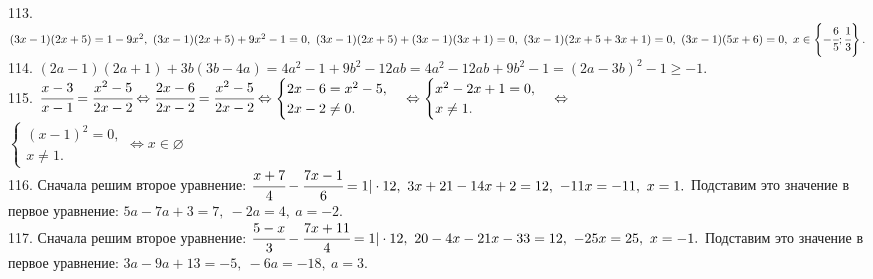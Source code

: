 113. $(3x-1)(2x+5)=1-9x^2,\ (3x-1)(2x+5)+9x^2-1=0,\ (3x-1)(2x+5)+(3x-1)(3x+1)=0,\ (3x-1)(2x+5+3x+1)=0,\ (3x-1)(5x+6)=0,\ x\in\left\{-\cfrac{6}{5};\cfrac{1}{3}\right\}.$\\
114. $(2a-1)(2a+1)+3b(3b-4a)=4a^2-1+9b^2-12ab=4a^2-12ab+9b^2-1=(2a-3b)^2-1\geqslant-1.$\\
115. $\cfrac{x-3}{x-1}=\cfrac{x^2-5}{2x-2}\Leftrightarrow \cfrac{2x-6}{2x-2}=\cfrac{x^2-5}{2x-2}\Leftrightarrow
\begin{cases} 2x-6=x^2-5,\\ 2x-2\neq0.\end{cases}\Leftrightarrow
\begin{cases} x^2-2x+1=0,\\ x\neq1.\end{cases}\Leftrightarrow$\\$
\begin{cases} (x-1)^2=0,\\ x\neq1.\end{cases}\Leftrightarrow x\in \varnothing$\\
116. Сначала решим второе уравнение: $\cfrac{x+7}{4}-\cfrac{7x-1}{6}=1|\cdot12,\ 3x+21-14x+2=12,\ -11x=-11,\ x=1.$ Подставим это значение в первое уравнение:
$5a-7a+3=7,\ -2a=4,\ a=-2.$\\
117. Сначала решим второе уравнение: $\cfrac{5-x}{3}-\cfrac{7x+11}{4}=1|\cdot12,\ 20-4x-21x-33=12,\ -25x=25,\ x=-1.$ Подставим это значение в первое уравнение:
$3a-9a+13=-5,\ -6a=-18,\ a=3.$
\newpage

